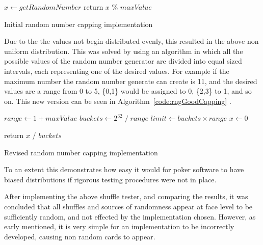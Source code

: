 \vspace{0.3cm}

\begin{algorithm}[H]
    \BlankLine{}
     $x \leftarrow getRandomNumber$\;
     return $x$ \% $maxValue$\;
\caption{Initial random number capping implementation}%
\label{code:rngBadCapping}
\end{algorithm}

\vspace{0.3cm}

Due to the the values not begin distributed evenly, this resulted in the
above non uniform distribution. This was solved by using an algorithm in which
all the possible values of the random number generator are divided into equal
sized intervals, each representing one of the desired values. For example
if the maximum number the random number generate can create is 11, and the
desired values are a range from 0 to 5, \{0,1\} would be assigned to 0, \{2,3\}
to 1, and so on. This new version can be seen in
Algorithm~\ref{code:rngGoodCapping} \parencite{website:reich2011}.

\vspace{0.3cm}

\begin{algorithm}[H]
    \BlankLine{}
     $range \leftarrow 1 + maxValue$\;
     $buckets \leftarrow {2}^{32}\; / \;range$\;
     $limit \leftarrow buckets \times range$\;
     $x \leftarrow 0$\;

     

     return $x$ / $buckets$\;
\caption{Revised random number capping implementation}%
\label{code:rngGoodCapping}
\end{algorithm}

\vspace{0.3cm}

To an extent this demonstrates how easy it would for poker software to have
biased distributions if rigorous testing procedures were not in place.

After implementing the above shuffle tester, and comparing the results,
it was concluded that all shuffles and sources of randomness appear at face
level to be sufficiently random, and not effected by the implementation chosen.
However, as early mentioned, it is very simple for an implementation to be
incorrectly developed, causing non random cards to appear.

